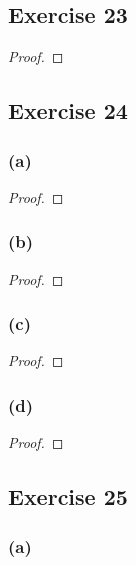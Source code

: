 \documentclass[14pt]{extarticle}
\begin{document}
\subsection{Exercise 23}

\begin{proof}

\end{proof}

\subsection{Exercise 24}

\subsubsection{(a)}

\begin{proof}

\end{proof}

\subsubsection{(b)}

\begin{proof}

\end{proof}

\subsubsection{(c)}

\begin{proof}

\end{proof}

\subsubsection{(d)}

\begin{proof}

\end{proof}

\subsection{Exercise 25}

\subsubsection{(a)}
\end{document}
